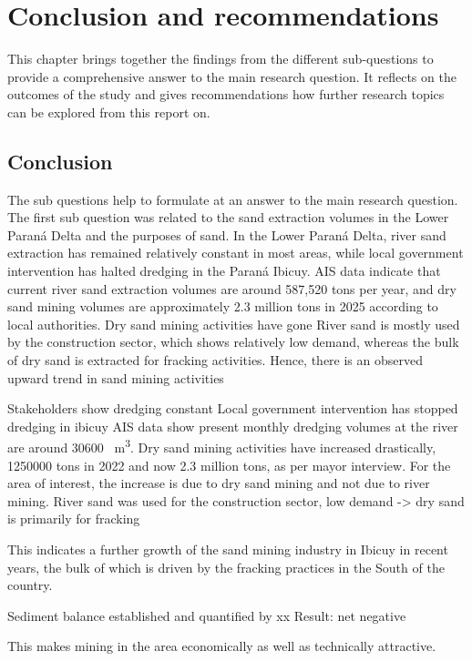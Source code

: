 \chapter{Conclusion and recommendations}
\label{chapter:conclusion}
This chapter brings together the findings from the different sub-questions to provide a comprehensive answer to the main research question. It reflects on the outcomes of the study and gives recommendations how further research topics can be explored from this report on.

\section{Conclusion}
The sub questions help to formulate at an answer to the main research question. The first sub question was related to the sand extraction volumes in the Lower Paraná Delta and the purposes of sand. In the Lower Paraná Delta, river sand extraction has remained relatively constant in most areas, while local government intervention has halted dredging in the Paraná Ibicuy. AIS data indicate that current river sand extraction volumes are around 587,520 tons per year, and dry sand mining volumes are approximately 2.3 million tons in 2025 according to local authorities. Dry sand mining activities have gone River sand is mostly used by the construction sector, which shows relatively low demand, whereas the bulk of dry sand is extracted for fracking activities. Hence, there is an observed upward trend in sand mining activities 


Stakeholders show dredging constant
Local government intervention has stopped dredging in ibicuy
AIS data show present monthly dredging volumes at the river are around 30600 ~m\textsuperscript{3}. 
Dry sand mining activities have increased drastically, 1250000 tons in 2022 and now 2.3 million tons, as per mayor interview.
For the area of interest, the increase is due to dry sand mining and not due to river mining.
River sand was used for the construction sector, low demand -> dry sand is primarily for fracking




This indicates a further growth of the sand mining industry in Ibicuy in recent years, the bulk of which is driven by the fracking practices in the South of the country.

Sediment balance established and quantified by xx
Result: net negative

This makes mining in the area economically as well as technically attractive.


